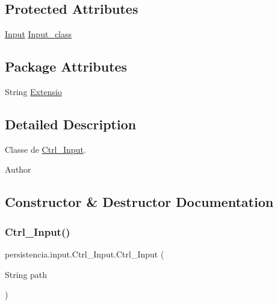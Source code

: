 \subsection*{Protected Attributes}
\begin{DoxyCompactItemize}
\item 
\hyperlink{classpersistencia_1_1input_1_1Input}{Input} \hyperlink{classpersistencia_1_1input_1_1Ctrl__Input_affe3c91673d80b61450970a69fe84611}{Input\+\_\+class}
\end{DoxyCompactItemize}
\subsection*{Package Attributes}
\begin{DoxyCompactItemize}
\item 
String \hyperlink{classpersistencia_1_1input_1_1Ctrl__Input_a6041b56aa31f01f75d02382f98e259e5}{Extensio}
\end{DoxyCompactItemize}


\subsection{Detailed Description}
Classe de \hyperlink{classpersistencia_1_1input_1_1Ctrl__Input}{Ctrl\+\_\+\+Input}. 

\begin{DoxyAuthor}{Author}

\end{DoxyAuthor}


\subsection{Constructor \& Destructor Documentation}
\mbox{\label{classpersistencia_1_1input_1_1Ctrl__Input_a00f3fa14d0329d6e4b9ddbe39ada1258}} 
\subsubsection{\texorpdfstring{Ctrl\+\_\+\+Input()}{Ctrl\_Input()}}
{\footnotesize\ttfamily persistencia.\+input.\+Ctrl\+\_\+\+Input.\+Ctrl\+\_\+\+Input (\begin{DoxyParamCaption}\item[{String}]{path }\end{DoxyParamCaption})\hspace{0.3cm}{\ttfamily [inline]}}




